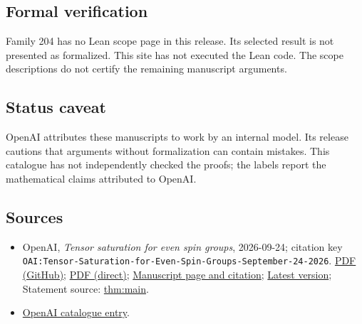 \documentclass[11pt]{article}
\begin{document}
\subsection{Formal verification}
Family 204 has no Lean scope page in this release. Its selected result is not presented as formalized. This site has not executed the Lean code. The scope descriptions do not certify the remaining manuscript arguments.

\subsection{Status caveat}
OpenAI attributes these manuscripts to work by an internal model. Its release cautions that arguments without formalization can contain mistakes. This catalogue has not independently checked the proofs; the labels report the mathematical claims attributed to OpenAI.

\subsection{Sources}
\begin{itemize}
\item OpenAI, \emph{Tensor saturation for even spin groups}, 2026-09-24; citation key \texttt{OAI:Tensor-Saturation-for-Even-Spin-Groups-September-24-2026}. \href{https://github.com/openai/math/blob/adc7f1241b42e322a6451854ab7e4b4c146bf78a/preprints/Tensor-Saturation-for-Even-Spin-Groups-September-24-2026/Tensor-Saturation-for-Even-Spin-Groups-September-24-2026.pdf}{PDF (GitHub)}; \href{https://github.com/openai/math/raw/adc7f1241b42e322a6451854ab7e4b4c146bf78a/preprints/Tensor-Saturation-for-Even-Spin-Groups-September-24-2026/Tensor-Saturation-for-Even-Spin-Groups-September-24-2026.pdf}{PDF (direct)}; \href{https://github.com/openai/math/blob/adc7f1241b42e322a6451854ab7e4b4c146bf78a/preprints/Tensor-Saturation-for-Even-Spin-Groups-September-24-2026/README.md}{Manuscript page and citation}; \href{https://github.com/openai/math/blob/main/preprints/Tensor-Saturation-for-Even-Spin-Groups-September-24-2026/Tensor-Saturation-for-Even-Spin-Groups-September-24-2026.pdf}{Latest version}; Statement source: \href{https://github.com/openai/math/blob/adc7f1241b42e322a6451854ab7e4b4c146bf78a/preprints/Tensor-Saturation-for-Even-Spin-Groups-September-24-2026/build/sections/01-introduction.tex\#L33}{thm:main}.
\item \href{https://github.com/openai/math/blob/adc7f1241b42e322a6451854ab7e4b4c146bf78a/CONTENTS.md}{OpenAI catalogue entry}.
\end{itemize}
\end{document}
